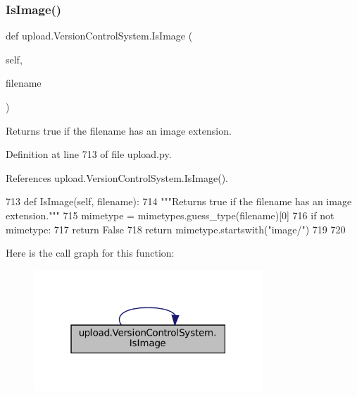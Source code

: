 \subsubsection{\texorpdfstring{Is\+Image()}{IsImage()}\hspace{0.1cm}{\footnotesize\ttfamily [1/2]}}
{\footnotesize\ttfamily def upload.\+Version\+Control\+System.\+Is\+Image (\begin{DoxyParamCaption}\item[{}]{self,  }\item[{}]{filename }\end{DoxyParamCaption})}

\begin{DoxyVerb}Returns true if the filename has an image extension.\end{DoxyVerb}
 

Definition at line 713 of file upload.\+py.



References upload.\+Version\+Control\+System.\+Is\+Image().


\begin{DoxyCode}
713   \textcolor{keyword}{def }IsImage(self, filename):
714     \textcolor{stringliteral}{"""Returns true if the filename has an image extension."""}
715     mimetype =  mimetypes.guess\_type(filename)[0]
716     \textcolor{keywordflow}{if} \textcolor{keywordflow}{not} mimetype:
717       \textcolor{keywordflow}{return} \textcolor{keyword}{False}
718     \textcolor{keywordflow}{return} mimetype.startswith(\textcolor{stringliteral}{"image/"})
719 
720 
\end{DoxyCode}
Here is the call graph for this function\+:
\nopagebreak
\begin{figure}[H]
\begin{center}
\leavevmode
\includegraphics[width=244pt]{classupload_1_1VersionControlSystem_a846889ecd2ef40870b456ddb5b349e02_cgraph}
\end{center}
\end{figure}
\mbox{\label{classupload_1_1VersionControlSystem_a846889ecd2ef40870b456ddb5b349e02}} 
